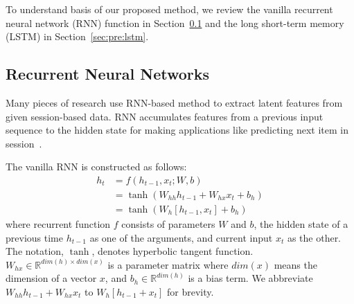 
To understand basis of our proposed method, we review the vanilla recurrent neural network (RNN) function in Section~\ref{sec:pre:rnn} and the long short-term memory (LSTM) in Section~\ref{sec:pre:lstm}.

\subsection{Recurrent Neural Networks}
\label{sec:pre:rnn}
Many pieces of research use RNN-based method to extract latent features from given session-based data.
RNN accumulates features from a previous input sequence to the hidden state for making applications like predicting next item in session~\cite{GuideToRNN, RNNReview}.

The vanilla RNN is constructed as follows:
\begin{align*}
	h_t &= f(h_{t-1},x_t;W,b) \\
		&= \tanh{(W_{hh}h_{t-1}+W_{hx}x_t+b_h)} \\
		&= \tanh{(W_{h}[h_{t-1},x_t]+b_h)}
\end{align*}
where recurrent function $f$ consists of parameters $W$ and $b$, the hidden state of a previous time $h_{t-1}$ as one of the arguments, and current input $x_t$ as the other.
The notation, $\tanh$, denotes hyperbolic tangent function.
$W_{hx} \in \mathbb{R}^{dim(h) \times dim(x)}$ is a parameter matrix where $dim(x)$ means the dimension of a vector $x$, and $b_h \in \mathbb{R}^{dim(h)}$ is a bias term.
We abbreviate $W_{hh}h_{t-1}+W_{hx}x_t$ to $W_h[h_{t-1}+x_t]$ for brevity.

